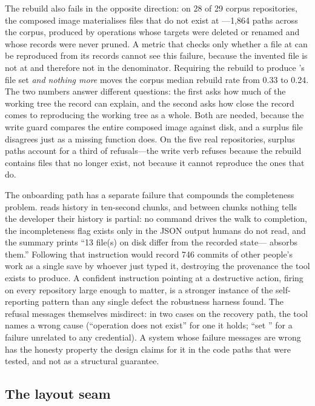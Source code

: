 The rebuild also fails in the opposite direction: on 28 of 29 corpus
repositories, the composed image materialises files that do not exist at
---1{,}864 paths across the corpus, produced by operations whose
targets were deleted or renamed and whose records were never pruned. A metric
that checks only whether a file at  can be reproduced from its records
cannot see this failure, because the invented file is not at  and
therefore not in the denominator. Requiring the rebuild to produce
's file set \emph{and nothing more} moves the corpus median rebuild
rate from 0.33 to 0.24. The two numbers answer different questions: the first
asks how much of the working tree the record can explain, and the second asks
how close the record comes to reproducing the working tree as a whole. Both are
needed, because the write guard compares the entire composed image against
disk, and a surplus file disagrees just as a missing function does. On the five
real repositories, surplus paths account for a third of refusals---the write
verb refuses because the rebuild contains files that no longer exist, not
because it cannot reproduce the ones that do.

The onboarding path has a separate failure that compounds the completeness problem.
\sgt{} reads history in ten-second chunks, and between chunks nothing tells the
developer their history is partial: no command drives the walk to completion, the
incompleteness flag exists only in the JSON output humans do not read, and the
summary prints ``13 file(s) on disk differ from the recorded state---
absorbs them.'' Following that instruction would record 746 commits of other
people's work as a single save by whoever just typed it, destroying the provenance
the tool exists to produce. A confident instruction pointing at a destructive
action, firing on every repository large enough to matter, is a stronger instance
of the self-reporting pattern than any single defect the robustness harness found.
The refusal messages themselves misdirect: in two cases on the recovery path, the
tool names a wrong cause (``operation does not exist'' for one it holds; ``set
'' for a failure unrelated to any credential). A system
whose failure messages are wrong has the honesty property the design claims for
it in the code paths that were tested, and not as a structural guarantee.

\subsection{The layout seam}
\label{sec:layout-seam}

